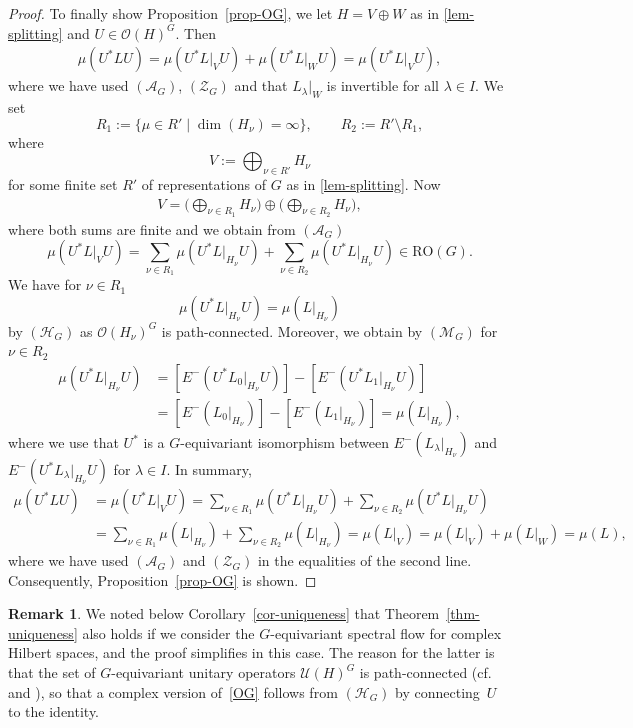 \documentclass[pdftex]{sigma}
\numberwithin{equation}{section}
\theoremstyle{definition}
\newtheorem{Remark}[Theorem]{Remark}
\begin{document}
\begin{proof}
To finally show Proposition~\ref{prop-OG}, we let $H=V\oplus W$ as in \eqref{lem-splitting} and $U\in\mathcal{O}(H)^G$. Then
\begin{align*}
\mu(U^\ast LU)=\mu(U^\ast L|_V U)+\mu(U^\ast L|_WU)=\mu(U^\ast L|_V U),
\end{align*}
where we have used $(\mathcal{A}_G)$, $(\mathcal{Z}_G)$ and that $L_\lambda|_W$ is invertible for all $\lambda\in I$. We set
\[R_1:=\{\mu\in R' \mid \dim(H_\nu)=\infty\},\qquad R_2:=R'\setminus R_1,\]
where
\[V:=\bigoplus_{\nu\in R'}H_\nu\]
for some finite set $R'$ of representations of $G$ as in \eqref{lem-splitting}. Now
\begin{align*}
V=\Biggl(\bigoplus_{\nu\in R_1}H_\nu\Biggr)\oplus\Biggl(\bigoplus_{\nu\in R_2}H_\nu\Biggr),
\end{align*}
where both sums are finite and we obtain from $(\mathcal{A}_G)$
\[\mu(U^\ast L|_VU)=\sum_{\nu\in R_1}\mu(U^\ast L|_{H_\nu}U)+\sum_{\nu\in R_2}\mu(U^\ast L|_{H_\nu}U)\in \mathrm{RO}(G).\]
We have for $\nu\in R_1$
\[\mu(U^\ast L|_{H_\nu}U)=\mu(L|_{H_\nu})\]
by $(\mathcal{H}_G)$ as $\mathcal{O}(H_\nu)^G$ is path-connected. Moreover, we obtain by $(\mathcal{M}_G)$ for $\nu\in R_2$
\begin{align*}
\mu(U^\ast L|_{H_\nu}U)&=[E^-(U^\ast L_0|_{H_\nu}U)]-[E^-(U^\ast L_1|_{H_\nu}U)]\\
&=[E^-(L_0|_{H_\nu})]-[E^-( L_1|_{H_\nu})]=\mu(L|_{H_\nu}),
\end{align*}
where we use that $U^\ast$ is a $G$-equivariant isomorphism between $E^-(L_\lambda|_{H_\nu})$ and $E^-(U^\ast L_\lambda|_{H_\nu}U)$ for $\lambda\in I$. In summary,
\begin{align*}
\mu(U^\ast LU)&=\mu(U^\ast L|_V U)=\sum_{\nu\in R_1}\mu(U^\ast L|_{H_\nu}U)+\sum_{\nu\in R_2}\mu(U^\ast L|_{H_\nu}U)\\
&=\sum_{\nu\in R_1}\mu(L|_{H_\nu})+\sum_{\nu\in R_2}\mu(L|_{H_\nu})=\mu(L|_V)=\mu(L|_V)+\mu(L|_W)=\mu(L),
\end{align*}
where we have used $(\mathcal{A}_G)$ and $(\mathcal{Z}_G)$ in the equalities of the second line. Consequently, Proposition~\ref{prop-OG} is shown.
\end{proof}

\begin{Remark}
We noted below Corollary~\ref{cor-uniqueness} that Theorem~\ref{thm-uniqueness} also holds if we consider the $G$\nobreakdash-equiv\-ari\-ant spectral flow for complex Hilbert spaces, and the proof simplifies in this case. The reason for the latter is that the set of $G$-equivariant unitary operators $\mathcal{U}(H)^G$ is path-connected (cf.\ \cite[Section~2.2]{shortdegree} and \cite{Broecker}), so that a complex version of~\eqref{OG} follows from $(\mathcal{H}_G)$ by connecting~$U$ to the identity.
\end{Remark}
\end{document}
